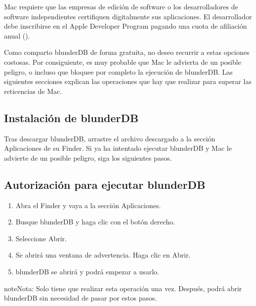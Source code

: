 \documentclass[letterpaper,10pt,spanish]{sphinxmanual}
\begin{document}
\sphinxAtStartPar
Mac requiere que las empresas de edición de software o los desarrolladores de software independientes certifiquen digitalmente sus aplicaciones. El desarrollador debe inscribirse en el Apple Developer Program pagando una cuota de afiliación anual ().

\sphinxAtStartPar
Como comparto blunderDB de forma gratuita, no deseo recurrir a estas opciones costosas. Por consiguiente, es muy probable que Mac le advierta de un posible peligro, o incluso que bloquee por completo la ejecución de blunderDB. Las siguientes secciones explican las operaciones que hay que realizar para superar las reticencias de Mac.


\subsection{Instalación de blunderDB}
\label{\detokenize{annexe_mac_securite:installation-de-blunderdb}}
\sphinxAtStartPar
Tras descargar blunderDB, arrastre el archivo descargado a la sección Aplicaciones de su Finder. Si ya ha intentado ejecutar blunderDB y Mac le advierte de un posible peligro, siga los siguientes pasos.


\subsection{Autorización para ejecutar blunderDB}
\label{\detokenize{annexe_mac_securite:autorisation-de-l-execution-de-blunderdb}}\begin{enumerate}
%
\item {} 
\sphinxAtStartPar
Abra el Finder y vaya a la sección Aplicaciones.

\item {} 
\sphinxAtStartPar
Busque blunderDB y haga clic con el botón derecho.

\item {} 
\sphinxAtStartPar
Seleccione Abrir.

\item {} 
\sphinxAtStartPar
Se abrirá una ventana de advertencia. Haga clic en Abrir.

\item {} 
\sphinxAtStartPar
blunderDB se abrirá y podrá empezar a usarlo.

\end{enumerate}

\begin{sphinxadmonition}{note}{Nota:}
\sphinxAtStartPar
Solo tiene que realizar esta operación una vez. Después, podrá abrir blunderDB sin necesidad de pasar por estos pasos.
\end{sphinxadmonition}
\end{document}
